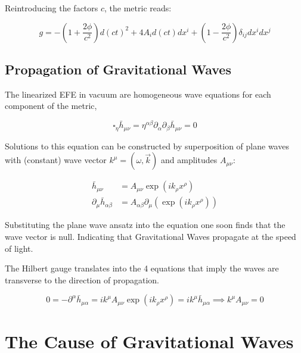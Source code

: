 Reintroducing the factors $c$, the metric reads:

\begin{equation}
    \label{eq:metric-no-stresses-source-complete}
    g = -\left( 1+\frac{2\phi}{c^2} \right)d(ct)^2 + 4A_i d(ct)dx^i +\left( 1-\frac{2\phi}{c^2} \right)\delta_{ij}dx^i dx^j
\end{equation}

\subsection{Propagation of Gravitational Waves}\label{subsec:propagation-of-gravitational-waves}
The linearized EFE in vacuum are homogeneous wave equations for each component of the metric,

\begin{equation}
    \label{eq:homogeneous-wave-equations-for-metric}
    \square_{\eta}\bar h_{\mu\nu} = \eta^{\alpha\beta}\partial_{\alpha}\partial_{\beta}\bar h_{\mu\nu} = 0
\end{equation}

Solutions to this equation can be constructed by superposition of plane waves with (constant) wave vector $k^\mu = (\omega, \vec k)$ and amplitudes $A_{\mu\nu}$:

\begin{align}
    \bar h_{\mu\nu} &= A_{\mu\nu} \exp\left( i k_\rho x^\rho \right)\\
    \partial_{\mu} \bar h_{\alpha\beta} &= A_{\alpha\beta}\partial_{\mu}(\exp\left( ik_\rho x^\rho\right))
\end{align}

Substituting the plane wave ansatz into the equation one soon finds that the wave vector is null.
Indicating that Gravitational Waves propagate at the speed of light.

The Hilbert gauge translates into the 4 equations that imply the waves are transverse to the direction of propagation.

\begin{equation}
    \label{eq:transverse-to-direction-propagation}
    0 = -\partial^{\alpha}\bar h_{\mu\alpha} = ik^{\mu} A_{\mu\nu}\exp\left(
    i k_{\rho}x^{\rho}
    \right) = ik^{\mu}\bar h_{\mu\alpha} \implies k^{\mu} A_{\mu\nu} =0
\end{equation}

\section{The Cause of Gravitational Waves}\label{sec:the-cause-of-gravitational-waves}
